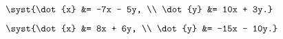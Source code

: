 \begin{multicols}{4}
\begin{enumtasks}
			\item \( \syst{\dot{x} &= -7x - 5y, \\ \dot{y} &= 10x + 3y.} \) %
			\item \( \syst{\dot{x} &= 8x + 6y, \\ \dot{y} &= -15x - 10y.} \) %

		\end{enumtasks}
	\end{multicols}

